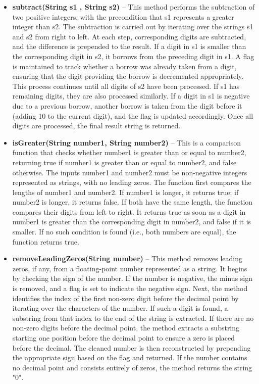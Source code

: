 \documentclass[a4paper,12pt]{article}
\begin{document}
\begin{itemize}
    \item \textbf{subtract(String s1 , String s2)} -- This method performs the subtraction of two positive integers, with the precondition that s1 represents a greater integer than s2. The subtraction is carried out by iterating over the strings s1 and s2 from right to left. At each step, corresponding digits are subtracted, and the difference is prepended to the result. If a digit in s1 is smaller than the corresponding digit in s2, it borrows from the preceding digit in s1. A flag is maintained to track whether a borrow was already taken from a digit, ensuring that the digit providing the borrow is decremented appropriately. This process continues until all digits of s2 have been processed. If s1 has remaining digits, they are also processed similarly. If a digit in s1 is negative due to a previous borrow, another borrow is taken from the digit before it (adding 10 to the current digit), and the flag is updated accordingly. Once all digits are processed, the final result string is returned.\\

    \item \textbf{isGreater(String number1, String number2)} -- This is a comparison function that checks whether number1 is greater than or equal to number2, returning true if number1 is greater than or equal to number2, and false otherwise. The inputs number1 and number2 must be non-negative integers represented as strings, with no leading zeros. The function first compares the lengths of number1 and number2. If number1 is longer, it returns true; if number2 is longer, it returns false. If both have the same length, the function compares their digits from left to right. It returns true as soon as a digit in number1 is greater than the corresponding digit in number2, and false if it is smaller. If no such condition is found (i.e., both numbers are equal), the function returns true.\\

    \item \textbf{removeLeadingZeros(String number)} -- This method removes leading zeros, if any, from a floating-point number represented as a string. It begins by checking the sign of the number. If the number is negative, the minus sign is removed, and a flag is set to indicate the negative sign. Next, the method identifies the index of the first non-zero digit before the decimal point by iterating over the characters of the number. If such a digit is found, a substring from that index to the end of the string is extracted. If there are no non-zero digits before the decimal point, the method extracts a substring starting one position before the decimal point to ensure a zero is placed before the decimal. The cleaned number is then reconstructed by prepending the appropriate sign based on the flag and returned. If the number contains no decimal point and consists entirely of zeros, the method returns the string "0".\\


\end{itemize}
\end{document}
